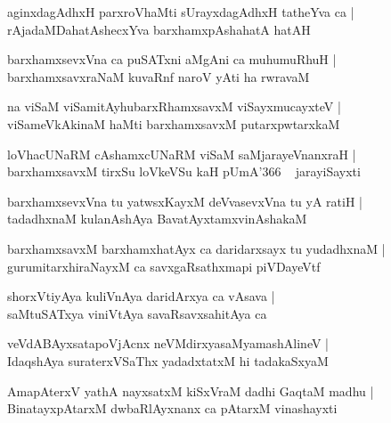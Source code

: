 \documentclass[twoside,12pt,openright]{book}
\newcounter{shloka}[chapter]
\begin{document}
\begin{shloka}%
aginxdagAdhxH parxroVhaMti sUrayxdagAdhxH tatheYva ca |\\
rAjadaMDahatAshecxYva barxhamxpAshahatA hatAH
\end{shloka}

\begin{shloka}%
barxhamxsevxVna ca puSATxni aMgAni ca muhumuRhuH |\\
barxhamxsavxraNaM kuvaRnf naroV yAti ha rwravaM
\end{shloka}

\begin{shloka}%
na viSaM viSamitAyhubarxRhamxsavxM viSayxmucayxteV |\\
viSameVkAkinaM haMti barxhamxsavxM putarxpwtarxkaM 
\end{shloka}

\begin{shloka}%
loVhacUNaRM cAshamxcUNaRM viSaM saMjarayeVnanxraH |\\
barxhamxsavxM tirxSu loVkeVSu kaH pUmA\char'366 ~ jarayiSayxti
\end{shloka}

\begin{shloka}%
barxhamxsevxVna tu yatwsxKayxM deVvasevxVna tu yA ratiH |\\
tadadhxnaM kulanAshAya BavatAyxtamxvinAshakaM
\end{shloka}

\begin{shloka}%
barxhamxsavxM barxhamxhatAyx ca daridarxsayx tu yudadhxnaM |\\
gurumitarxhiraNayxM ca savxgaRsathxmapi piVDayeVtf
\end{shloka}

\begin{shloka}%
shorxVtiyAya kuliVnAya daridArxya ca vAsava |\\
saMtuSATxya viniVtAya savaRsavxsahitAya ca
\end{shloka}

\begin{shloka}%
veVdABAyxsatapoVjAcnx neVMdirxyasaMyamashAlineV |\\
IdaqshAya suraterxVSaThx yadadxtatxM hi tadakaSxyaM 
\end{shloka}

\begin{shloka}%
AmapAterxV yathA nayxsatxM kiSxVraM dadhi GaqtaM madhu |\\
BinatayxpAtarxM dwbaRlAyxnanx ca pAtarxM vinashayxti
\end{shloka}
\end{document}
